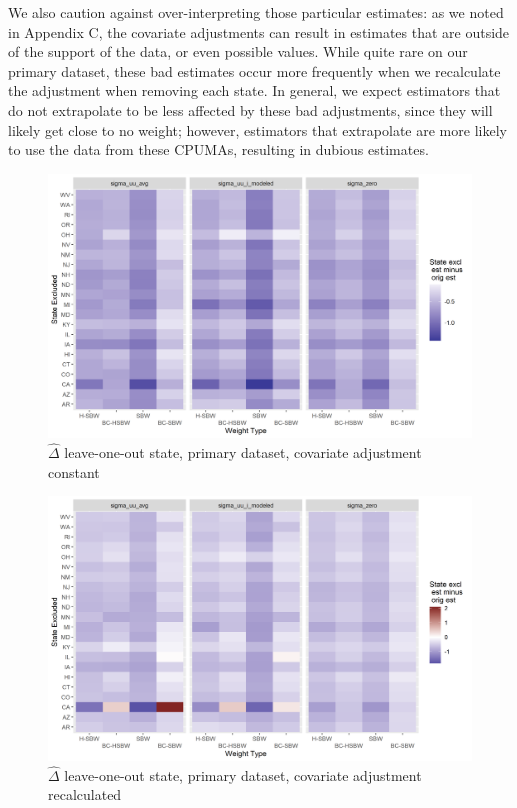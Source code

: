 \documentclass[aoas]{imsart}
\theoremstyle{plain}
\theoremstyle{remark}
\begin{document}
\begin{appendix}
We also caution against over-interpreting those particular estimates: as we noted in Appendix C, the covariate adjustments can result in estimates that are outside of the support of the data, or even possible values. While quite rare on our primary dataset, these bad estimates occur more frequently when we recalculate the adjustment when removing each state. In general, we expect estimators that do not extrapolate to be less affected by these bad adjustments, since they will likely get close to no weight; however, estimators that extrapolate are more likely to use the data from these CPUMAs, resulting in dubious estimates. 

\begin{figure}[]
\begin{center}
    \caption{$\hat{\Delta}$ leave-one-out state, primary dataset, covariate adjustment constant}
    \label{fig:rdiffc1state}
    \includegraphics[scale=0.6]{01_Plots/loostate-repub-sensitivityc1-state-main.png}
\end{center}
\end{figure}

\begin{figure}[]
\begin{center}
    \caption{$\hat{\Delta}$ leave-one-out state, primary dataset, covariate adjustment recalculated}
    \label{fig:rdiffc1proc}
    \includegraphics[scale=0.6]{01_Plots/loostate-repub-sensitivityc1-proc-main.png}
\end{center}
\end{figure}


\end{appendix}
\end{document}
